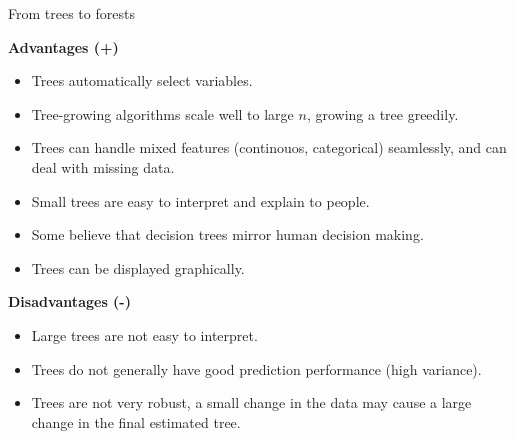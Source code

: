 \documentclass[10pt,ignorenonframetext,]{beamer}
\providecommand{\tightlist}{%
  \setlength{\itemsep}{0pt}\setlength{\parskip}{0pt}}
\begin{document}
\begin{frame}{From trees to forests}

\textbf{Advantages (+)}

\begin{itemize}
\tightlist
\item
  Trees automatically select variables.
\item
  Tree-growing algorithms scale well to large \(n\), growing a tree
  greedily.
\item
  Trees can handle mixed features (continouos, categorical) seamlessly,
  and can deal with missing data.
\item
  Small trees are easy to interpret and explain to people.
\item
  Some believe that decision trees mirror human decision making.
\item
  Trees can be displayed graphically.
\end{itemize}

\textbf{Disadvantages (-)}

\begin{itemize}
\tightlist
\item
  Large trees are not easy to interpret.
\item
  Trees do not generally have good prediction performance (high
  variance).
\item
  Trees are not very robust, a small change in the data may cause a
  large change in the final estimated tree.
\end{itemize}

\end{frame}
\end{document}
